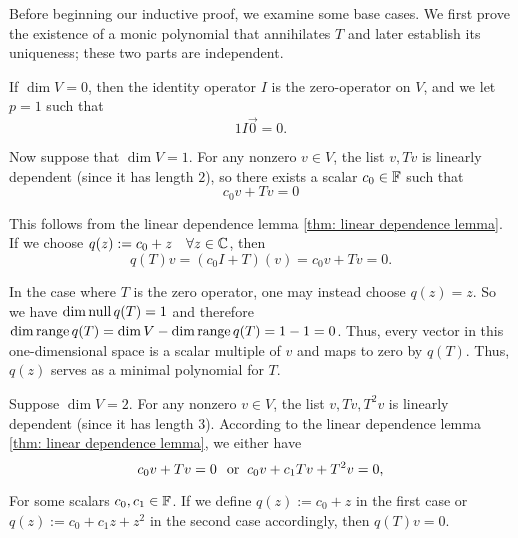 \begin{prf}
  Before beginning our inductive proof, we examine some base cases. We first prove the existence of a monic polynomial that annihilates $T$ and later establish its uniqueness; these two parts are independent.


   If $\dim V=0$, then the identity operator $I$ is the zero-operator on $V$, and we let $p=1$ such that
  \begin{equation}
      1I\vec0=0.
  \end{equation}

   Now suppose that $\dim V=1$. For any nonzero $v \in V$, the list $v, Tv$ is linearly dependent (since it has length $2$), so there exists a scalar $c_0 \in \mathbb{F}$ such that
  \begin{equation}
    c_0v + Tv = 0
  \end{equation}

  This follows from the linear dependence lemma \ref{thm: linear dependence lemma}. If we choose $q(z) := c_0+z \quad \forall z \in \mathbb{C}$, then
  \begin{equation}
    q(T)v=(c_0 I+T)(v)=c_0v+Tv=0.
  \end{equation}

  In the case where $T$ is the zero operator, one may instead choose $q(z) = z$. So we have $\dim \operatorname{null} q(T) = 1$ and therefore $\dim \operatorname{range} q(T) = \dim V - \dim \operatorname{range} q(T) = 1-1= 0$. Thus, every vector in this one-dimensional space is a scalar multiple of $v$ and maps to zero by $q(T)$. Thus, $q(z)$ serves as a minimal polynomial for $T$.

   Suppose $\dim V=2$. For any nonzero $v \in V$, the list $v, Tv, T^2v$ is linearly dependent (since it has length $3$). According to the linear dependence lemma \ref{thm: linear dependence lemma}, we either have
  \begin{equation}
     c_0v + Tv = 0 \;\;\, \text{or}\;\;
     c_0v + c_1Tv + T^2v = 0,
  \end{equation}

  For some scalars $c_0, c_1 \in  \mathbb{F}$. If we define $q(z) := c_0+z$ in the first case or $q(z) := c_0+c_1z+z^2$ in the second case accordingly, then $q(T)v=0$.


\end{prf}
